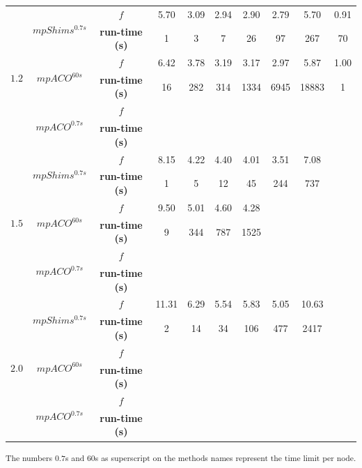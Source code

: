 \documentclass[preprint,authoryear]{elsarticle}
\begin{document}
\begin{table}[H]
\begin{tabular}{cccccccccc}
		
		\multirow{6}{*}{$1.2$} &\multirow{2}{*}{ $mpShims^{0.7s}$}& $f$                & 5.70  & 3.09  & 2.94  & 2.90  & 2.79  & 5.70  & 0.91  \\%
		                       &                                 & {\bf run-time (s)} & 1     & 3     & 7     & 26    & 97    & 267   & 70  \\%
		                       \cmidrule{2-10}
		                       &\multirow{2}{*}{ $mpACO^{60s}$}   & $f$                & 6.42  & 3.78  &  3.19 & 3.17  & 2.97  & 5.87  & 1.00  \\ %
                               &                                 & {\bf run-time (s)} & 16    & 282   &  314  & 1334  & 6945  & 18883 & 1  \\ %
		\cmidrule{2-10}		                       
							   &\multirow{2}{*}{ $mpACO^{0.7s}$}  & $f$                &&&&&&&\\
							   &                                 & {\bf run-time (s)} &&&&&&&\\                               
		\midrule
		\multirow{6}{*}{$1.5$} &\multirow{2}{*}{ $mpShims^{0.7s}$}& $f$                & 8.15  & 4.22  & 4.40  & 4.01  & 3.51  & 7.08  &   \\
		                       &                                 & {\bf run-time (s)} & 1     & 5     & 12    & 45    & 244   & 737   &   \\
		\cmidrule{2-10}
		                       &\multirow{2}{*}{ $mpACO^{60s}$}   & $f$                & 9.50  & 5.01  & 4.60  & 4.28  &&&\\
		                       &                                 & {\bf run-time (s)} & 9     & 344   & 787   & 1525  &&&\\
		\cmidrule{2-10}		                       
							   &\multirow{2}{*}{ $mpACO^{0.7s}$}  & $f$                &&&&&&&\\
							   &                                 & {\bf run-time (s)} &&&&&&&\\		                       
		\midrule
		\multirow{6}{*}{$2.0$} &\multirow{2}{*}{ $mpShims^{0.7s}$}& $f$                & 11.31 & 6.29  & 5.54  & 5.83  & 5.05  & 10.63 &   \\
		                       &                                 & {\bf run-time (s)} & 2     & 14    & 34    & 106   & 477   & 2417  &   \\
		\cmidrule{2-10}
		                       &\multirow{2}{*}{ $mpACO^{60s}$}   & $f$                &&&&&&&\\
		                       &                                 & {\bf run-time (s)} &&&&&&&\\
		\cmidrule{2-10}		                       
		                       &\multirow{2}{*}{ $mpACO^{0.7s}$}  & $f$                &&&&&&&\\
							   &                                 & {\bf run-time (s)} &&&&&&&\\
		\bottomrule	
		

	\end{tabular}
\textsuperscript{The numbers 0.7s and 60s as superscript on the methods names represent the time limit per node.}	
\normalsize
\end{table}
\end{document}
